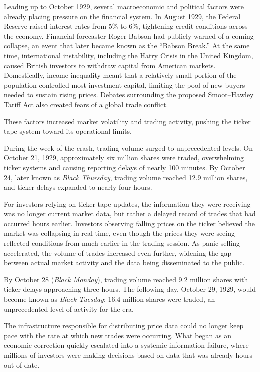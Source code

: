 \begin{casehistory}
Leading up to October 1929, several macroeconomic and political factors were already placing pressure on the financial system. In August 1929, the Federal Reserve raised interest rates from 5\% to 6\%, tightening credit conditions across the economy.
Financial forecaster Roger Babson had publicly warned of a coming collapse, an event that later became known as the ``Babson Break.''
At the same time, international instability, including the Hatry Crisis in the United Kingdom, caused British investors to withdraw capital from American markets.
Domestically, income inequality meant that a relatively small portion of the population controlled most investment capital, limiting the pool of new buyers needed to sustain rising prices.
Debates surrounding the proposed Smoot--Hawley Tariff Act also created fears of a global trade conflict.

These factors increased market volatility and trading activity, pushing the ticker tape system toward its operational limits.

During the week of the crash, trading volume surged to unprecedented levels. On October 21, 1929, approximately six million shares were traded, overwhelming ticker systems and causing reporting delays of nearly 100 minutes.
By October 24, later known as \textit{Black Thursday}, trading volume reached 12.9 million shares, and ticker delays expanded to nearly four hours.

For investors relying on ticker tape updates, the information they were receiving was no longer current market data, but rather a delayed record of trades that had occurred hours earlier.
Investors observing falling prices on the ticker believed the market was collapsing in real time, even though the prices they were seeing reflected conditions from much earlier in the trading session.
As panic selling accelerated, the volume of trades increased even further, widening the gap between actual market activity and the data being disseminated to the public.

By October 28 (\textit{Black Monday}), trading volume reached 9.2 million shares with ticker delays approaching three hours.
The following day, October 29, 1929, would become known as \textit{Black Tuesday}: 16.4 million shares were traded, an unprecedented level of activity for the era.

The infrastructure responsible for distributing price data could no longer keep pace with the rate at which new trades were occurring.
What began as an economic correction quickly escalated into a systemic information failure, where millions of investors were making decisions based on data that was already hours out of date.
\end{casehistory}

